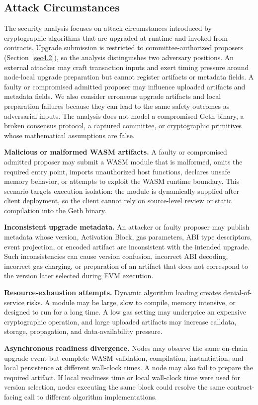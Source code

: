 \documentclass[pdflatex,sn-mathphys-num]{sn-jnl}%
\theoremstyle{thmstyleone}%
\theoremstyle{thmstyletwo}%
\theoremstyle{thmstylethree}%
\begin{document}
\subsection{Attack Circumstances}\label{sec4.1}
The security analysis focuses on attack circumstances introduced by cryptographic algorithms that are upgraded at runtime and invoked from contracts. Upgrade submission is restricted to committee-authorized proposers (Section~\ref{sec4.2}), so the analysis distinguishes two adversary positions. An external attacker may craft transaction inputs and exert timing pressure around node-local upgrade preparation but cannot register artifacts or metadata fields. A faulty or compromised admitted proposer may influence uploaded artifacts and metadata fields. We also consider erroneous upgrade artifacts and local preparation failures because they can lead to the same safety outcomes as adversarial inputs. The analysis does not model a compromised Geth binary, a broken consensus protocol, a captured committee, or cryptographic primitives whose mathematical assumptions are false.

\noindent\textbf{Malicious or malformed WASM artifacts.}
A faulty or compromised admitted proposer may submit a WASM module that is malformed, omits the required entry point, imports unauthorized host functions, declares unsafe memory behavior, or attempts to exploit the WASM runtime boundary. This scenario targets execution isolation: the module is dynamically supplied after client deployment, so the client cannot rely on source-level review or static compilation into the Geth binary.

\noindent\textbf{Inconsistent upgrade metadata.}
An attacker or faulty proposer may publish metadata whose version, Activation Block, gas parameters, ABI type descriptors, event projection, or encoded artifact are inconsistent with the intended upgrade. Such inconsistencies can cause version confusion, incorrect ABI decoding, incorrect gas charging, or preparation of an artifact that does not correspond to the version later selected during EVM execution.

\noindent\textbf{Resource-exhaustion attempts.}
Dynamic algorithm loading creates denial-of-service risks. A module may be large, slow to compile, memory intensive, or designed to run for a long time. A low gas setting may underprice an expensive cryptographic operation, and large uploaded artifacts may increase calldata, storage, propagation, and data-availability pressure.

\noindent\textbf{Asynchronous readiness divergence.}
Nodes may observe the same on-chain upgrade event but complete WASM validation, compilation, instantiation, and local persistence at different wall-clock times. A node may also fail to prepare the required artifact. If local readiness time or local wall-clock time were used for version selection, nodes executing the same block could resolve the same contract-facing call to different algorithm implementations.
\end{document}
